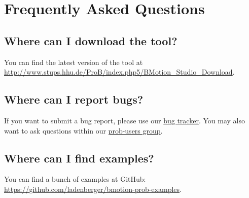 \chapter{Frequently Asked Questions}
\label{faq}

\section{Where can I download the tool?}
\label{download}

You can find the latest version of the tool at \url{http://www.stups.hhu.de/ProB/index.php5/BMotion_Studio_Download}.

\section{Where can I report bugs?}
\label{bugs}

If you want to submit a bug report, please use our \href{http://jira.cobra.cs.uni-duesseldorf.de/}{bug tracker}. 
You may also want to ask questions within our \href{https://groups.google.com/d/forum/prob-users}{prob-users group}.

\section{Where can I find examples?}
\label{examples}

You can find a bunch of examples at GitHub: \url{https://github.com/ladenberger/bmotion-prob-examples}.

